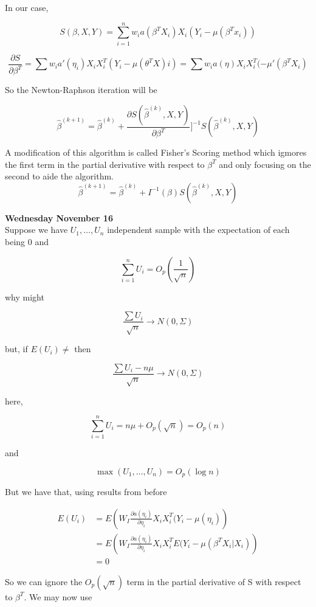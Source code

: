 \documentclass[11pt,fleqn]{book} %
\begin{document}
 	In our case, 

 		$$S(\beta, X, Y) = \sum^n_{i=1} w_i a(\beta^T X_i) X_i (Y_i - \mu(\beta^T x_i)) $$


 		$$\frac{\partial S}{\partial \beta^T} = \sum w_i a'(\eta_i) X_i X_i^T (Y_i - \mu(\theta^T X)i) = \sum w_i a(\eta) X_i X_i^T (-\mu'(\beta^T X_i) $$


 	So the Newton-Raphson iteration will be

 			$$\hat{\beta}^{(k +1)} = \hat{\beta}^{(k)} + \frac{\partial S(\hat{\beta}^{(k)}, X, Y)}{\partial \beta^T}]^{-1} S(\hat{\beta}^{(k)}, X, Y) $$

 	A modification of this algorithm is called Fisher's Scoring method which igmores the first term in the partial derivative with respect to $\beta^T$ and only focusing on the second to aide the algorithm. \\

 			$$\hat{\beta}^{(k +1)} = \hat{\beta}^{(k)} + I^{-1}(\beta) S(\hat{\beta}^{(k)}, X, Y) $$


\textbf{Wednesday November 16}\\


Suppose we have $U_1, \dots, U_n$ independent sample with the expectation of each being 0 and

		$$\sum^n_{i=1} U_i = O_p (\frac{1}{\sqrt{n}}) $$


why might

		$$\frac{\sum U_i}{\sqrt{n}} \rightarrow N(0, \Sigma) $$

but, if $E(U_i) \neq$ then 

		$$\frac{\sum U_i - n\mu}{\sqrt{n}} \rightarrow N(0, \Sigma) $$


here, 

		$$ \sum^n_{i=1} U_i = n\mu + O_p(\sqrt{n}) = O_p(n)$$

and 

		$$\max(U_1, \dots, U_n) = O_p(\log n) $$

But we have that, using results from before

		\begin{align*}
			E(U_i) &= E\left(W_I \frac{\partial a(\eta_i)}{\partial \eta_i} X_i X_i^T (Y_i -\mu(\eta_i)\right)\\
					&= E\left(W_I \frac{\partial a(\eta_i)}{\partial \eta_i} X_i X_i^T E(Y_i -\mu(\beta^T X_i|X_i)\right)\\
					&= 0
		\end{align*}

So we can ignore the $O_p(\sqrt{n})$ term in the partial derivative of S with respect to $\beta^T$. We may now use
\end{document}
